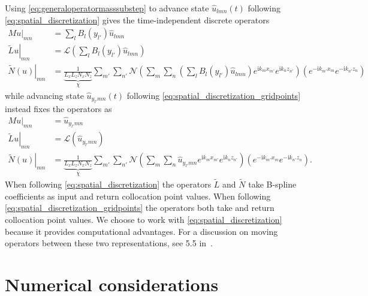 \documentclass[letterpaper,11pt,nointlimits,reqno]{amsart}
\newcommand{\ii}{\ensuremath{\mathrm{i}}}
\begin{document}
Using \eqref{eq:generaloperatormasssubstep} to advance state
$\hat{u}_{l m n}(t)$ following \eqref{eq:spatial_discretization} gives
the time-independent discrete operators
\begin{subequations}
\begin{align}
   M u\bigr|_{m n}
&= \sum_{l} B_l\!\left(y_{l'}\right)
   \hat{u}_{l m n}
\\
   \left.\tilde{L} u\right|_{m n}
&= \mathscr{L}\left(
     \sum_{l}
     B_l\!\left(y_{l'}\right)
     \hat{u}_{l m n}
   \right)
\\
   \left.\tilde{N}\!\left(u\right)\right|_{m n}
&= \underbrace{\frac{1}{L_x L_z N_x N_z}}_{\chi}
   \sum_{m'} \sum_{n'}
   \mathscr{N}\left(
     \sum_{m}
     \sum_{n}
     \left(
       \sum_{l} B_l\!\left(y_{l'}\right)
       \hat{u}_{l m n}
     \right)
     e^{\ii k_m x_{m'}}e^{\ii k_n z_{n'}}
   \right)
   \left(
     e^{-\ii k_{m'} x_m}e^{-\ii k_{n'} z_n}
   \right)
\end{align}
\end{subequations}
while advancing state $\hat{u}_{y_{l'} m n}(t)$ following
\eqref{eq:spatial_discretization_gridpoints} instead fixes the operators as
\begin{subequations}
\begin{align}
   M u\bigr|_{m n}
&= \hat{u}_{y_{l'} m n}
\\
   \left.\tilde{L} u\right|_{m n}
&= \mathscr{L}\left(\hat{u}_{y_{l'} m n}\right)
\\
   \left.\tilde{N}\!\left(u\right)\right|_{m n}
&= \underbrace{\frac{1}{L_x L_z N_x N_z}}_{\chi}
   \sum_{m'} \sum_{n'}
   \mathscr{N}\left(
     \sum_{m}
     \sum_{n}
     \hat{u}_{y_{l'} m n}
     e^{\ii k_m x_{m'}}e^{\ii k_n z_{n'}}
   \right)
   \left(
     e^{-\ii k_{m'} x_m}e^{-\ii k_{n'} z_n}
   \right)
   .
\end{align}
\end{subequations}
When following \eqref{eq:spatial_discretization} the operators $\tilde{L}$ and
$\tilde{N}$ take B-spline coefficients as input and return collocation point
values.  When following \eqref{eq:spatial_discretization_gridpoints} the
operators both take and return collocation point values.  We choose to work
with \eqref{eq:spatial_discretization} because it provides computational
advantages.  For a discussion on moving operators between these two
representations, see \textsection{}5.5 in~\cite{Boyd2001}.

\section{Numerical considerations}
\end{document}
